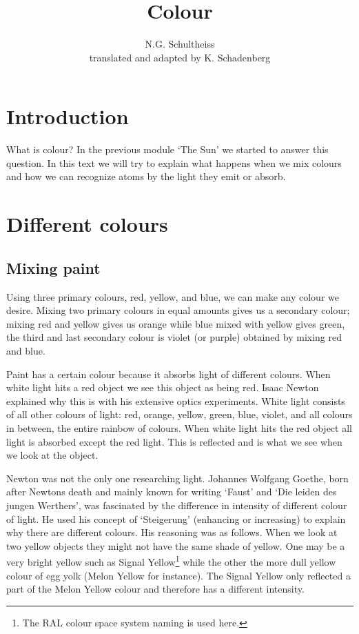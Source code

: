 


\author{N.G. Schultheiss \\ translated and adapted by K. Schadenberg}
\date{}
\title{Colour}



\maketitle

\section{Introduction}
What is colour? In the previous module `The Sun' we started to answer this question. In this text we will try to explain what happens when we mix colours and how we can recognize atoms by the light they emit or absorb.

\section{Different colours}
\subsection{Mixing paint}
Using three primary colours, red, yellow, and blue, we can make any colour we desire. Mixing two primary colours in equal amounts gives us a secondary colour; mixing red and yellow gives us orange while blue mixed with yellow gives green, the third and last secondary colour is violet (or purple) obtained by mixing red and blue.

Paint has a certain colour because it absorbs light of different colours. When white light hits a red object we see this object as being red. Isaac Newton explained why this is with his extensive optics experiments. White light consists of all other colours of light: red, orange, yellow, green, blue, violet, and all colours in between, the entire rainbow of colours. When white light hits the red object all light is absorbed except the red light. This is reflected and is what we see when we look at the object.

Newton was not the only one researching light. Johannes Wolfgang Goethe, born after Newtons death and mainly known for writing `Faust' and `Die leiden des jungen Werthers',  was fascinated by the difference in intensity of different colour of light. He used his concept of `Steigerung' (enhancing or increasing) to explain why there are different colours. His reasoning was as follows. When we look at two yellow objects they might not have the same shade of yellow. One may be a very bright yellow such as Signal Yellow\footnote{The RAL colour space system naming is used here.} while the other the more dull yellow colour of egg yolk (Melon Yellow for instance). The Signal Yellow only reflected a part of the Melon Yellow colour and therefore has a different intensity.

